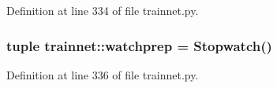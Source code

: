 Definition at line 334 of file trainnet.py.

\hypertarget{namespacetrainnet_ad40ddd24354da1881bc9fe8b6547b5fa}{
\subsubsection[{watchprep}]{\setlength{\rightskip}{0pt plus 5cm}tuple {\bf trainnet::watchprep} = Stopwatch()}}
\label{namespacetrainnet_ad40ddd24354da1881bc9fe8b6547b5fa}


Definition at line 336 of file trainnet.py.

